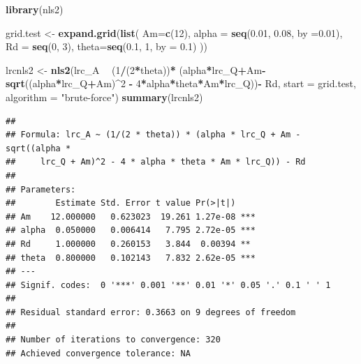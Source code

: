 \documentclass[]{krantz}
\makeatletter
\newenvironment{Shaded}{\begin{snugshade}}{\end{snugshade}}
\newcommand{\KeywordTok}[1]{\textcolor[rgb]{0.13,0.29,0.53}{\textbf{#1}}}
\newcommand{\DataTypeTok}[1]{\textcolor[rgb]{0.13,0.29,0.53}{#1}}
\newcommand{\DecValTok}[1]{\textcolor[rgb]{0.00,0.00,0.81}{#1}}
\newcommand{\FloatTok}[1]{\textcolor[rgb]{0.00,0.00,0.81}{#1}}
\newcommand{\StringTok}[1]{\textcolor[rgb]{0.31,0.60,0.02}{#1}}
\newcommand{\OperatorTok}[1]{\textcolor[rgb]{0.81,0.36,0.00}{\textbf{#1}}}
\newcommand{\NormalTok}[1]{#1}
\newenvironment{kframe}{%
\medskip{}
\setlength{\fboxsep}{.8em}
 \def\at@end@of@kframe{}%
 \ifinner\ifhmode%
  \def\at@end@of@kframe{\end{minipage}}%
  \begin{minipage}{\columnwidth}%
 \fi\fi%
 \def\FrameCommand##1{\hskip\@totalleftmargin \hskip-\fboxsep
 \colorbox{shadecolor}{##1}\hskip-\fboxsep
     \hskip-\linewidth \hskip-\@totalleftmargin \hskip\columnwidth}%
 \MakeFramed {\advance\hsize-\width
   \@totalleftmargin\z@ \linewidth\hsize
   \@setminipage}}%
 {\par\unskip\endMakeFramed%
 \at@end@of@kframe}
\renewenvironment{Shaded}{\begin{kframe}}{\end{kframe}}
\theoremstyle{definition}
\theoremstyle{definition}
\theoremstyle{definition}
\theoremstyle{remark}
\makeatother
\begin{document}
\begin{Shaded}
\begin{Highlighting}[]
\KeywordTok{library}\NormalTok{(nls2)}

\NormalTok{grid.test <-}\StringTok{ }\KeywordTok{expand.grid}\NormalTok{(}\KeywordTok{list}\NormalTok{(}
  \DataTypeTok{Am=}\KeywordTok{c}\NormalTok{(}\DecValTok{12}\NormalTok{),}
  \DataTypeTok{alpha =} \KeywordTok{seq}\NormalTok{(}\FloatTok{0.01}\NormalTok{, }\FloatTok{0.08}\NormalTok{, }\DataTypeTok{by =}\FloatTok{0.01}\NormalTok{),}
  \DataTypeTok{Rd =} \KeywordTok{seq}\NormalTok{(}\DecValTok{0}\NormalTok{, }\DecValTok{3}\NormalTok{),}
  \DataTypeTok{theta=}\KeywordTok{seq}\NormalTok{(}\FloatTok{0.1}\NormalTok{, }\DecValTok{1}\NormalTok{, }\DataTypeTok{by =} \FloatTok{0.1}\NormalTok{)}
\NormalTok{  ))}

\NormalTok{lrcnls2 <-}\StringTok{ }\KeywordTok{nls2}\NormalTok{(lrc_A }\OperatorTok{~}\StringTok{ }
\StringTok{        }\NormalTok{(}\DecValTok{1}\OperatorTok{/}\NormalTok{(}\DecValTok{2}\OperatorTok{*}\NormalTok{theta))}\OperatorTok{*}
\StringTok{        }\NormalTok{(alpha}\OperatorTok{*}\NormalTok{lrc_Q}\OperatorTok{+}\NormalTok{Am}\OperatorTok{-}\KeywordTok{sqrt}\NormalTok{((alpha}\OperatorTok{*}\NormalTok{lrc_Q}\OperatorTok{+}\NormalTok{Am)}\OperatorTok{^}\DecValTok{2} \OperatorTok{-}\StringTok{ }
\StringTok{                               }\DecValTok{4}\OperatorTok{*}\NormalTok{alpha}\OperatorTok{*}\NormalTok{theta}\OperatorTok{*}\NormalTok{Am}\OperatorTok{*}\NormalTok{lrc_Q))}\OperatorTok{-}\StringTok{ }
\StringTok{        }\NormalTok{Rd, }\DataTypeTok{start =}\NormalTok{ grid.test, }\DataTypeTok{algorithm =} \StringTok{"brute-force"}\NormalTok{)}
\KeywordTok{summary}\NormalTok{(lrcnls2)}
\end{Highlighting}
\end{Shaded}

\begin{verbatim}
## 
## Formula: lrc_A ~ (1/(2 * theta)) * (alpha * lrc_Q + Am - sqrt((alpha * 
##     lrc_Q + Am)^2 - 4 * alpha * theta * Am * lrc_Q)) - Rd
## 
## Parameters:
##        Estimate Std. Error t value Pr(>|t|)    
## Am    12.000000   0.623023  19.261 1.27e-08 ***
## alpha  0.050000   0.006414   7.795 2.72e-05 ***
## Rd     1.000000   0.260153   3.844  0.00394 ** 
## theta  0.800000   0.102143   7.832 2.62e-05 ***
## ---
## Signif. codes:  0 '***' 0.001 '**' 0.01 '*' 0.05 '.' 0.1 ' ' 1
## 
## Residual standard error: 0.3663 on 9 degrees of freedom
## 
## Number of iterations to convergence: 320 
## Achieved convergence tolerance: NA
\end{verbatim}
\end{document}
